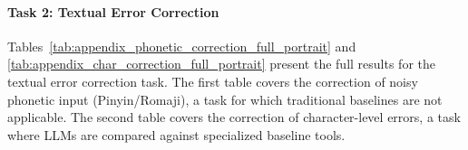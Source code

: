 \documentclass[10pt, a4paper]{article}
\begin{document}
\paragraph{Task 2: Textual Error Correction}

Tables~\ref{tab:appendix_phonetic_correction_full_portrait} and \ref{tab:appendix_char_correction_full_portrait} present the full results for the textual error correction task. The first table covers the correction of noisy phonetic input (Pinyin/Romaji), a task for which traditional baselines are not applicable. The second table covers the correction of character-level errors, a task where LLMs are compared against specialized baseline tools.

\end{document}
